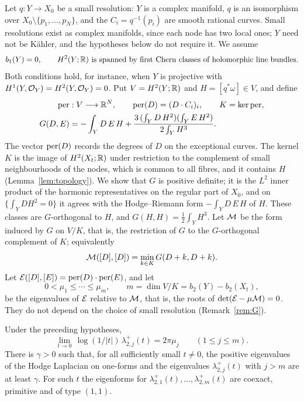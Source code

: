 Let $q:Y\to X_0$ be a small resolution: $Y$ is a complex manifold, $q$ is
an isomorphism over $X_0\setminus\{p_1,\ldots,p_N\}$, and the
$C_i=q^{-1}(p_i)$ are smooth rational curves. Small resolutions exist as complex manifolds, since each node has two
local ones; $Y$ need not be K\"ahler, and the hypotheses below do not
require it. We assume
\begin{equation}\label{eq:hypotheses}
 b_1(Y)=0,\qquad H^2(Y;\mathbb R)\ \text{is spanned by first Chern classes of
 holomorphic line bundles.}
\end{equation}
Both conditions hold, for instance, when $Y$ is projective with
$H^1(Y,\mathcal O_Y)=H^2(Y,\mathcal O_Y)=0$. Put $V=H^2(Y;\mathbb R)$ and
$H=[q^*\omega]\in V$, and define
\begin{equation}\label{eq:intro-data}
\begin{split}
 \operatorname{per}&:V\longrightarrow\mathbb R^N,\qquad \operatorname{per}(D)=(D\cdot C_i)_i,\qquad K=\ker\operatorname{per},\\
 G(D,E)&=-\int_YD\,E\,H+\frac{3\,(\int_YD\,H^2)(\int_YE\,H^2)}
 {2\int_YH^3}.
\end{split}
\end{equation}
The vector $\operatorname{per}(D)$ records the degrees of $D$ on the exceptional
curves. The kernel $K$ is the image of $H^2(X_t;\mathbb R)$ under restriction to the
complement of small neighbourhoods of the nodes, which is common to all
fibres, and it contains $H$ (Lemma~\ref{lem:topology}). We show that $G$ is
positive definite; it is the $L^2$ inner product of the harmonic
representatives on the regular part of $X_0$, and on
$\{\int_YDH^2=0\}$ it agrees with the Hodge--Riemann form
$-\int_YD\,E\,H$ of $H$. These classes are $G$-orthogonal to $H$, and
$G(H,H)=\tfrac12\int_YH^3$. Let $\mathcal M$
be the form induced by $G$ on $V/K$, that is, the restriction of $G$ to
the $G$-orthogonal complement of $K$; equivalently
\[
 \mathcal M([D],[D])=\min_{k\in K}G(D+k,D+k).
\]
Let $\mathcal E([D],[E])=\operatorname{per}(D)\cdot\operatorname{per}(E)$, and let
\[
 0<\mu_1\le\cdots\le\mu_m,\qquad m=\dim V/K=b_2(Y)-b_2(X_t),
\]
be the eigenvalues of $\mathcal E$ relative to $\mathcal M$, that is, the roots of
$\det(\mathcal E-\mu\mathcal M)=0$. They do not depend on the choice of small
resolution (Remark~\ref{rem:G}).

\begin{theorem}\label{thm:main}
Under the preceding hypotheses,
\begin{equation}\label{eq:main}
 \lim_{t\to0}\,\log(1/|t|)\,\lambda^+_{2,j}(t)=2\pi\mu_j
 \qquad(1\le j\le m).
\end{equation}
There is $\gamma>0$ such that, for all sufficiently small $t\ne0$, the
positive eigenvalues of the Hodge Laplacian on one-forms and the
eigenvalues $\lambda^+_{2,j}(t)$ with $j>m$ are at least $\gamma$. For
such $t$ the eigenforms for $\lambda^+_{2,1}(t),\ldots,\lambda^+_{2,m}(t)$
are coexact, primitive and of type $(1,1)$.
\end{theorem}

